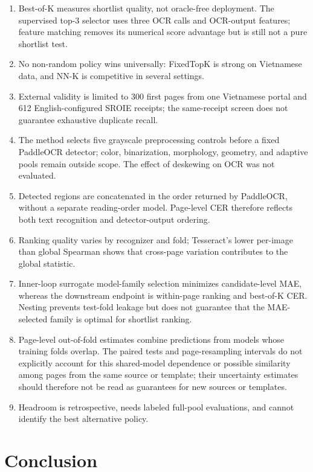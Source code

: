 \documentclass[pdflatex,sn-basic,Numbered,iicol]{sn-jnl}
\begin{document}
\begin{enumerate}
    \item Best-of-K measures shortlist quality, not oracle-free deployment. The supervised top-3 selector uses three OCR calls and OCR-output features; feature matching removes its numerical score advantage but is still not a pure shortlist test.
    \item No non-random policy wins universally: FixedTopK is strong on Vietnamese data, and NN-K is competitive in several settings.
    \item External validity is limited to 300 first pages from one Vietnamese portal and 612 English-configured SROIE receipts; the same-receipt screen does not guarantee exhaustive duplicate recall.
    \item The method selects five grayscale preprocessing controls before a fixed PaddleOCR detector; color, binarization, morphology, geometry, and adaptive pools remain outside scope. The effect of deskewing on OCR was not evaluated.
    \item Detected regions are concatenated in the order returned by PaddleOCR, without a separate reading-order model. Page-level CER therefore reflects both text recognition and detector-output ordering.
    \item Ranking quality varies by recognizer and fold; Tesseract's lower per-image than global Spearman shows that cross-page variation contributes to the global statistic.
    \item Inner-loop surrogate model-family selection minimizes candidate-level MAE, whereas the downstream endpoint is within-page ranking and best-of-K CER. Nesting prevents test-fold leakage but does not guarantee that the MAE-selected family is optimal for shortlist ranking.
    \item Page-level out-of-fold estimates combine predictions from models whose training folds overlap. The paired tests and page-resampling intervals do not explicitly account for this shared-model dependence or possible similarity among pages from the same source or template; their uncertainty estimates should therefore not be read as guarantees for new sources or templates.
    \item Headroom is retrospective, needs labeled full-pool evaluations, and cannot identify the best alternative policy.
\end{enumerate}

\section{Conclusion}
\label{sec:conclusion}
\end{document}
